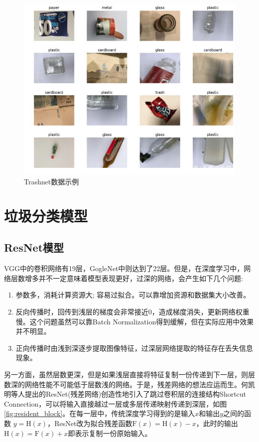 \documentclass[a4paper]{article}
\begin{document}
\begin{CJK*}{UTF8}{gbsn}
\begin{enumerate}
\begin{figure}[h!]
\centering
\includegraphics[scale=0.3]{trashnet_example.jpeg}
\caption{Trashnet数据示例}
\label{fig:trashnet_example}
\end{figure}

\end{enumerate}

\section{垃圾分类模型}
\subsection{ResNet模型}

VGG中的卷积网络有19层，GogleNet中则达到了22层。但是，在深度学习中，网络层数增多并不一定意味着模型表现更好，过深的网络，会产生如下几个问题:

\begin{enumerate}
    \item 参数多，消耗计算资源大; 容易过拟合。可以靠增加资源和数据集大小改善。
    \item 反向传播时，回传到浅层的梯度会非常接近0，造成梯度消失，更新网络权重慢。这个问题虽然可以靠Batch Normalization得到缓解，但在实际应用中效果并不明显。
    \item 正向传播时由浅到深逐步提取图像特征，过深层网络提取的特征存在丢失信息现象。
\end{enumerate}

另一方面，虽然层数更深，但是如果浅层直接将特征复制一份传递到下一层，则层数深的网络性能不可能低于层数浅的网络。于是，残差网络的想法应运而生。何凯明等人提出的ResNet(残差网络)\cite{he2016deep}创造性地引入了跳过卷积层的连接结构Shortcut Connection，可以将输入直接越过一层或多层传递映射传递到深层，如图\ref{fig:resident_block}。在每一层中，传统深度学习得到的是输入$x$和输出$y$之间的函数 $y=\mathrm{H}(x)$，ResNet改为拟合残差函数$\mathrm{F}(x)=\mathrm{H}(x)-x$，此时的输出$\mathrm{H}(x)=\mathrm{F}(x)+x$即表示复制一份原始输入。


\end{CJK*}
\end{document}
